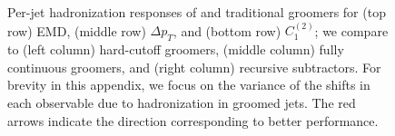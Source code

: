 \begin{subappendices}
\begin{figure}[p]
{    }
    \caption[Per-jet \gls{hadronization} responses of the EMD, \(\Delta p_T\), and \(\Delta C_1^{(2)}\) using a plethora of fully continuous, hard-cutoff, and recusive subtraction grooming strategies.]{
    Per-jet \gls{hadronization} responses of \PIRANHA{} and traditional groomers for (top row) EMD, (middle row) \(\Delta p_T\), and (bottom row) \(C_1^{(2)}\);
    we compare  to (left column) hard-cutoff groomers, (middle column) fully continuous groomers, and (right column) recursive subtractors.
    For brevity in this appendix, we focus on the variance of the shifts in each observable due to \gls{hadronization} in groomed jets.
    The red arrows indicate the direction corresponding to better performance.
}
\label{fig:pvhfrenzy}
\end{figure}




\end{subappendices}
